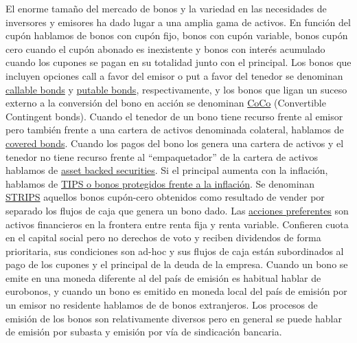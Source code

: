 \documentclass{nuevotema}
\begin{document}
El enorme tamaño del mercado de bonos y la variedad en las necesidades de inversores y emisores ha dado lugar a una amplia gama de activos. En función del cupón hablamos de bonos con cupón fijo, bonos con cupón variable, bonos cupón cero cuando el cupón abonado es inexistente y bonos con interés acumulado cuando los cupones se pagan en su totalidad junto con el principal. Los bonos que incluyen opciones call a favor del emisor o put a favor del tenedor se denominan \underline{callable bonds} y \underline{putable bonds}, respectivamente, y los bonos que ligan un suceso externo a la conversión del bono en acción se denominan \underline{CoCo} (Convertible Contingent bonds). Cuando el tenedor de un bono tiene recurso frente al emisor pero también frente a una cartera de activos denominada colateral, hablamos de \underline{covered bonds}. Cuando los pagos del bono los genera una cartera de activos y el tenedor no tiene recurso frente al ``empaquetador'' de la cartera de activos hablamos de \underline{asset backed securities}. Si el principal aumenta con la inflación, hablamos de \underline{TIPS o bonos protegidos frente a la inflación}. Se denominan \underline{STRIPS} aquellos bonos cupón-cero obtenidos como resultado de vender por separado los flujos de caja que genera un bono dado. Las \underline{acciones preferentes} son activos financieros en la frontera entre renta fija y renta variable. Confieren cuota en el capital social pero no derechos de voto y reciben dividendos de forma prioritaria, sus condiciones son ad-hoc y sus flujos de caja están subordinados al pago de los cupones y el principal de la deuda de la empresa. Cuando un bono se emite en una moneda diferente al del país de emisión es habitual hablar de eurobonos, y cuando un bono es emitido en moneda local del país de emisión por un emisor no residente hablamos de de bonos extranjeros. Los procesos de emisión de los bonos son relativamente diversos pero en general se puede hablar de emisión por subasta y emisión por vía de sindicación bancaria.
\end{document}
